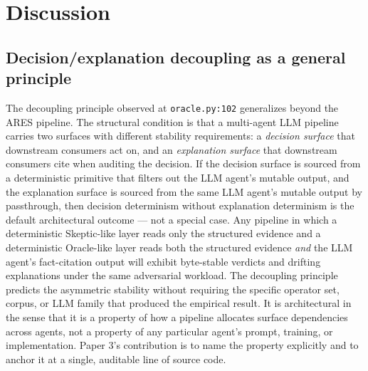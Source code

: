 \documentclass[sigconf,anonymous,review,nonacm=false]{acmart}
\begin{document}
\section{Discussion}

\subsection{Decision/explanation decoupling as a general principle}
The decoupling principle observed at \texttt{oracle.py:102} generalizes beyond the ARES pipeline. The structural condition is that a multi-agent LLM pipeline carries two surfaces with different stability requirements: a \textit{decision surface} that downstream consumers act on, and an \textit{explanation surface} that downstream consumers cite when auditing the decision. If the decision surface is sourced from a deterministic primitive that filters out the LLM agent's mutable output, and the explanation surface is sourced from the same LLM agent's mutable output by passthrough, then decision determinism without explanation determinism is the default architectural outcome — not a special case. Any pipeline in which a deterministic Skeptic-like layer reads only the structured evidence and a deterministic Oracle-like layer reads both the structured evidence \textit{and} the LLM agent's fact-citation output will exhibit byte-stable verdicts and drifting explanations under the same adversarial workload. The decoupling principle predicts the asymmetric stability without requiring the specific operator set, corpus, or LLM family that produced the empirical result. It is architectural in the sense that it is a property of how a pipeline allocates surface dependencies across agents, not a property of any particular agent's prompt, training, or implementation. Paper 3's contribution is to name the property explicitly and to anchor it at a single, auditable line of source code.
\end{document}
